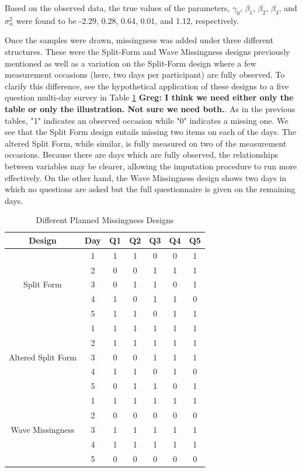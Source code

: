 \documentclass{svjour3}\usepackage[]{graphicx}\usepackage[]{color}
\begin{document}
Based on the observed data, the true values of the parameters, $\gamma_0$, $\beta_1$, $\beta_2$, $\beta_3$, and $\sigma_\alpha^2$ were found to be -2.29, 0.28, 0.64, 0.01, and 1.12, respectively. \par
Once the samples were drawn, missingness was added under three different structures. These were the Split-Form and Wave Missingness designs previously mentioned as well as a variation on the Split-Form design where a few measurement occasions (here, two days per participant) are fully observed. To clarify this difference, see the hypothetical application of these designs to a five question multi-day survey in Table \ref{tab:table14} \textbf{Greg: I think we need either only the table or only the illustration.  Not sure we need both.}. As in the previous tables, "1" indicates an observed occasion while "0" indicates a missing one. We see that the Split Form design entails missing two items on each of the days. The altered Split Form, while similar, is fully measured on two of the measurement occasions. Because there are days which are fully observed, the relationships between variables may be clearer, allowing the imputation procedure to run more effectively. On the other hand, the Wave Missingness design shows two days in which no questions are asked but the full questionnaire is given on the remaining days. \par

\begin{table}[H]
	\centering
	\caption{Different Planned Missingness Designs}
	\setlength{\tabcolsep}{0.45cm}
	\label{tab:table14}
	\hspace*{-1cm}
	\begin{tabular}{c|c|ccccc}
		\toprule
		Design & Day & Q1 & Q2 & Q3 & Q4 & Q5 \\
		\midrule
		\multirow{5}{*}{Split Form}
		& 1 & 1 & 1 & 0 & 0 & 1 \\
		& 2 & 0 & 0 & 1 & 1 & 1 \\
		& 3 & 0 & 1 & 1 & 0 & 1 \\
		& 4 & 1 & 0 & 1 & 1 & 0 \\
		& 5 & 1 & 1 & 0 & 1 & 1 \\
		\midrule
		\midrule
		\multirow{5}{*}{Altered Split Form}
		& 1 & 1 & 1 & 1 & 1 & 1 \\
		& 2 & 1 & 1 & 1 & 1 & 1 \\
		& 3 & 0 & 0 & 1 & 1 & 1 \\
		& 4 & 1 & 1 & 0 & 1 & 0 \\
		& 5 & 0 & 1 & 1 & 0 & 1 \\
		\midrule
		\midrule
		\multirow{5}{*}{Wave Missingness}
		& 1 & 1 & 1 & 1 & 1 & 1 \\
		& 2 & 0 & 0 & 0 & 0 & 0 \\
		& 3 & 1 & 1 & 1 & 1 & 1 \\
		& 4 & 1 & 1 & 1 & 1 & 1 \\
		& 5 & 0 & 0 & 0 & 0 & 0 \\
		\bottomrule
	\end{tabular}
	\hspace*{-1cm}	
\end{table}
\end{document}
